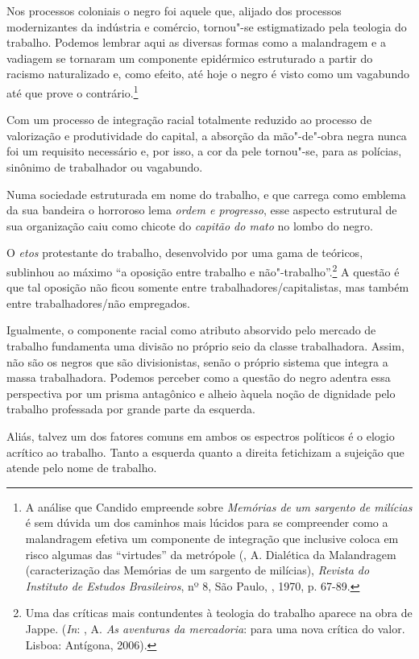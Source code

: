 Nos processos coloniais o negro foi aquele que, alijado dos processos
modernizantes da indústria e comércio, tornou"-se estigmatizado pela
teologia do trabalho. Podemos lembrar aqui as diversas formas como a
malandragem e a vadiagem se tornaram um componente epidérmico
estruturado a partir do racismo naturalizado e, como efeito, até hoje o
negro é visto como um vagabundo até que prove o contrário.\footnote{A
  análise que Candido empreende sobre \emph{Memórias de um sargento de
  milícias} é sem dúvida um dos caminhos mais lúcidos para se
  compreender como a malandragem efetiva um componente de integração que
  inclusive coloca em risco algumas das ``virtudes'' da metrópole
  (, A. Dialética da Malandragem (caracterização das Memórias de
  um sargento de milícias), \emph{Revista do Instituto de Estudos
  Brasileiros}, nº 8, São Paulo, , 1970, p. 67-89.}

Com um processo de integração racial totalmente reduzido ao processo de
valorização e produtividade do capital, a absorção da mão"-de"-obra negra
nunca foi um requisito necessário e, por isso, a cor da pele tornou"-se,
para as polícias, sinônimo de trabalhador ou vagabundo.

Numa sociedade estruturada em nome do trabalho, e que carrega como
emblema da sua bandeira o horroroso lema \emph{ordem e progresso}, esse
aspecto estrutural de sua organização caiu como chicote do \emph{capitão
do mato} no lombo do negro.

O \emph{etos} protestante do trabalho, desenvolvido por uma gama de
teóricos, sublinhou ao máximo ``a oposição entre trabalho e
não"-trabalho''.\footnote{Uma das críticas mais contundentes à teologia do
  trabalho aparece na obra de Jappe. (\emph{In}: , A. \emph{As aventuras
  da mercadoria}: para uma nova crítica do valor. Lisboa: Antígona,
  2006).} A questão é que tal oposição não ficou somente entre
trabalhadores/capitalistas, mas também entre trabalhadores/não
empregados.

Igualmente, o componente racial como atributo absorvido pelo mercado de
trabalho fundamenta uma divisão no próprio seio da classe trabalhadora.
Assim, não são os negros que são divisionistas, senão o próprio sistema
que integra a massa trabalhadora. Podemos perceber como a questão do
negro adentra essa perspectiva por um prisma antagônico e alheio àquela
noção de dignidade pelo trabalho professada por grande parte da
esquerda.

Aliás, talvez um dos fatores comuns em ambos os espectros políticos é o
elogio acrítico ao trabalho. Tanto a esquerda quanto a direita
fetichizam a sujeição que atende pelo nome de trabalho.

